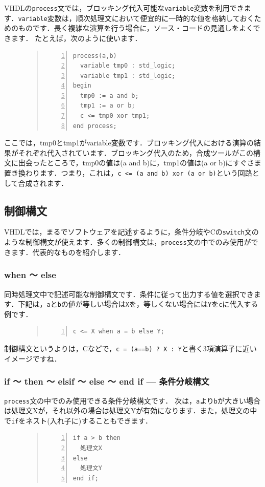 \documentclass[a4paper,dvipdfmx]{jsarticle}
\begin{document}
VHDLの\verb|process|文では，ブロッキング代入可能な\verb|variable|変数を利用できます．\verb|variable|変数は，順次処理文において便宜的に一時的な値を格納しておくためのものです．長く複雑な演算を行う場合に，ソース・コードの見通しをよくできます．
たとえば，次のように使います．
\begin{figure}[H]
\begin{quote}
\begin{Verbatim}[frame=single, numbers=left, baselinestretch=0.8]
process(a,b)
  variable tmp0 : std_logic;
  variable tmp1 : std_logic;
begin
  tmp0 := a and b;
  tmp1 := a or b;
  c <= tmp0 xor tmp1;
end process;
\end{Verbatim}
\end{quote}
\end{figure}
ここでは，tmp0とtmp1がvariable変数です．ブロッキング代入における演算の結果がそれぞれ代入されています．ブロッキング代入のため，合成ツールがこの構文に出会ったところで，tmp0の値は(a and b)に，tmp1の値は(a or b)にすぐさま置き換わります．つまり，これは，\verb|c <= (a and b) xor (a or b)|という回路として合成されます．

\subsection{制御構文}
VHDLでは，まるでソフトウェアを記述するように，条件分岐やCの\verb|switch|文のような制御構文が使えます．多くの制御構文は，\verb|process|文の中でのみ使用ができます．代表的なものを紹介します．

\subsubsection{when 〜 else}
同時処理文中で記述可能な制御構文です．条件に従って出力する値を選択できます．下記は，\verb|a|と\verb|b|の値が等しい場合は\verb|X|を，等しくない場合には\verb|Y|を\verb|c|に代入する例です．
\begin{figure}[H]
\begin{quote}
\begin{Verbatim}[frame=single, numbers=left, baselinestretch=0.8]
c <= X when a = b else Y;
\end{Verbatim}
\end{quote}
\end{figure}
制御構文というよりは，Cなどで，\verb|c = (a==b) ? X : Y|と書く3項演算子に近いイメージですね．

\subsubsection{if 〜 then 〜 elsif 〜 else 〜 end if --- 条件分岐構文}
\verb|process|文の中でのみ使用できる条件分岐構文です．
次は，\verb|a|より\verb|b|が大きい場合は処理文Xが，それ以外の場合は処理文Yが有効になります．また，処理文の中で\verb|if|をネスト(入れ子に)することもできます．
\begin{figure}[H]
\begin{quote}
\begin{Verbatim}[frame=single, numbers=left, baselinestretch=0.8]
if a > b then
  処理文X
else
  処理文Y
end if;
\end{Verbatim}
\end{quote}
\end{figure}
\end{document}
